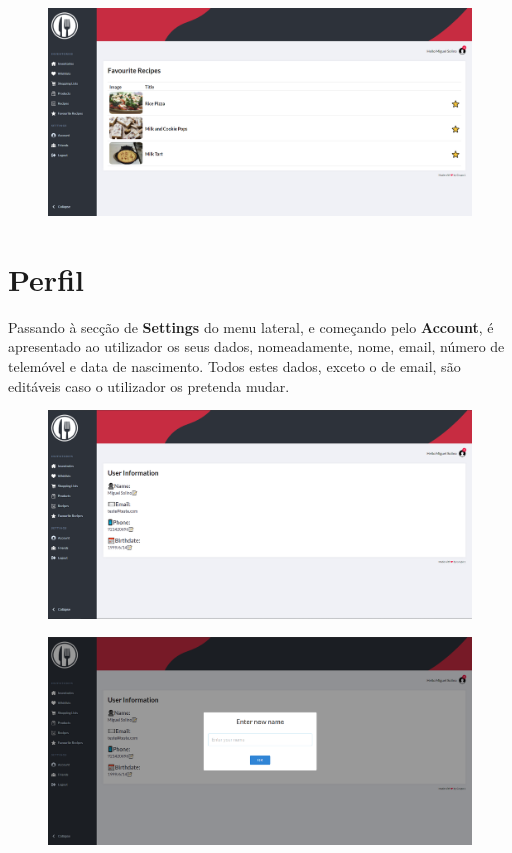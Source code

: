 \documentclass[a4paper]{report}
\begin{document}
    \begin{figure}[H]
        \centering
            \includegraphics[width=\textwidth]{images/produto_final/receitas_favoritas.png}
    \end{figure}

    \section{Perfil}

    Passando à secção de \textbf{Settings} do menu lateral, e começando pelo 
    \textbf{Account}, é apresentado ao utilizador os seus dados, nomeadamente,
    nome, email, número de telemóvel e data de nascimento. Todos estes dados, 
    exceto o de email, são editáveis caso o utilizador os pretenda mudar.

    \begin{figure}[H]
        \centering
            \includegraphics[width=\textwidth]{images/produto_final/pagina_de_perfil.png}
    \end{figure}

    \begin{figure}[H]
        \centering
            \includegraphics[width=\textwidth]{images/produto_final/alterar_nome_perfil.png}
    \end{figure}
\end{document}
